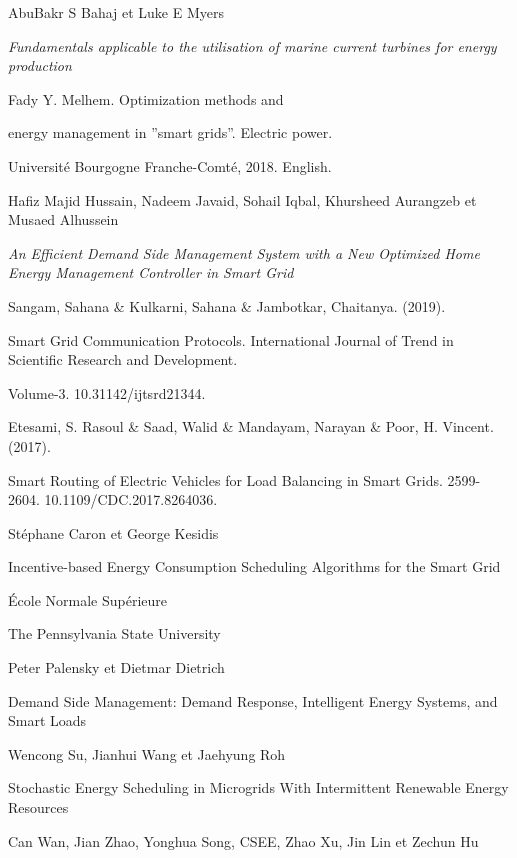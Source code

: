 \begin{thebibliography}{9}
  AbuBakr S Bahaj et Luke E Myers

  \textit{Fundamentals applicable to the utilisation of marine current turbines for energy production}

  Fady Y. Melhem. Optimization methods and

  energy management in ”smart grids”. Electric power.

  Université Bourgogne Franche-Comté, 2018. English.

  Hafiz Majid Hussain, Nadeem Javaid, Sohail Iqbal, Khursheed Aurangzeb et Musaed Alhussein

  \textit{An Efficient Demand Side Management System with a New Optimized Home Energy Management Controller in Smart Grid}

  Sangam, Sahana \& Kulkarni, Sahana \& Jambotkar, Chaitanya. (2019).

  Smart Grid Communication Protocols. International Journal of Trend in Scientific Research and Development.

  Volume-3. 10.31142/ijtsrd21344.

  Etesami, S. Rasoul \& Saad, Walid \& Mandayam, Narayan \& Poor, H. Vincent. (2017).

  Smart Routing of Electric Vehicles for Load Balancing in Smart Grids. 2599-2604. 10.1109/CDC.2017.8264036.

  Stéphane Caron et George Kesidis

  Incentive-based Energy Consumption Scheduling Algorithms for the Smart Grid

  École Normale Supérieure

  The Pennsylvania State University

  Peter Palensky et Dietmar Dietrich

  Demand Side Management: Demand Response, Intelligent Energy Systems, and Smart Loads

  Wencong Su, Jianhui Wang et Jaehyung Roh

  Stochastic Energy Scheduling in Microgrids With Intermittent Renewable Energy Resources


  Can Wan, Jian Zhao, Yonghua Song, CSEE, Zhao Xu, Jin Lin et Zechun Hu


\end{thebibliography}
